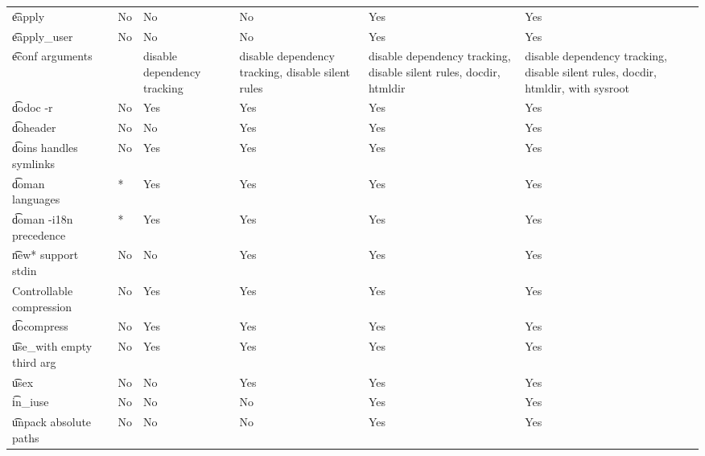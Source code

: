\begin{landscape}
\begin{longtable}{llP{7.5em}P{7.5em}P{7.5em}P{7.5em}P{7.5em}}
\t{eapply} &  &
    No & No & No & Yes & Yes \\

\t{eapply_user} &  &
    No & No & No & Yes & Yes \\

\t{econf} arguments &  &
    & disable dependency tracking &
    disable dependency tracking, disable silent rules &
    disable dependency tracking, disable silent rules, docdir, htmldir &
    disable dependency tracking, disable silent rules, docdir, htmldir, with sysroot \\

\t{dodoc -r} &  &
    No & Yes & Yes & Yes & Yes \\

\t{doheader} &  &
    No & No & Yes & Yes & Yes \\

\t{doins} handles symlinks &  &
    No & Yes & Yes & Yes & Yes \\

\t{doman} languages &  &
    * & Yes & Yes & Yes & Yes \\

\t{doman -i18n} precedence &  &
    * & Yes & Yes & Yes & Yes \\

\t{new*} support stdin &  &
    No & No & Yes & Yes & Yes \\

Controllable compression &  &
    No & Yes & Yes & Yes & Yes \\

\t{docompress} &  &
    No & Yes & Yes & Yes & Yes \\

\t{use_with} empty third arg &  &
    No & Yes & Yes & Yes & Yes \\

\t{usex} &  &
    No & No & Yes & Yes & Yes \\

\t{in_iuse} &  &
    No & No & No & Yes & Yes \\

\t{unpack} absolute paths &  &
    No & No & No & Yes & Yes \\


\end{longtable}
\end{landscape}
